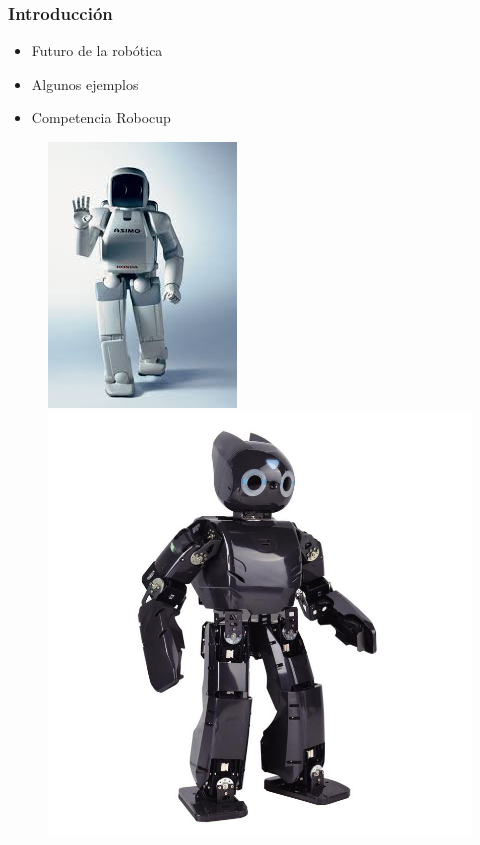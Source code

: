 \documentclass{beamer}
\begin{document}
\begin{frame}
  \frametitle{Introducci\'{o}n}
  \begin{block}{}
  \begin{itemize}
    \item Futuro de la robótica 
    \item Algunos ejemplos
    \item Competencia Robocup
  \end{itemize}
  \end{block}

\begin{figure}

\includegraphics[scale=0.3]{asimo.jpg} 
\includegraphics[scale=0.1]{Darwin_OP.jpg} 

\end{figure}
\end{frame}
\end{document}
